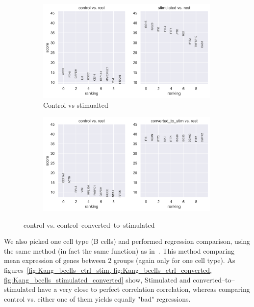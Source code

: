 \documentclass[11pt, a4paper]{report}
\theoremstyle{plain}
\theoremstyle{definition}
\theoremstyle{remark}
\begin{document}
\begin{figure}[h]
\centering
\begin{subfigure}[t]{0.99\textwidth}
\includegraphics[width=0.99\textwidth]{images/Kang_super_val_ctrl_vs_stimulated.png}
\caption{Control vs stimualted}
\end{subfigure}
\begin{subfigure}[t]{0.99\textwidth}
\includegraphics[width=0.99\textwidth]{images/Kang_super_val_ctrl_vs_converted.png}
\caption{}
\end{subfigure}
\caption{control vs. control--converted--to--stimulated}
\label{fig:Kang_super_gene_markers}
\end{figure}

We also picked one cell type (B cells) and performed regression comparison,
using the same method (in fact the same function) as
in~\cite{lotfollahi2019scgen}. This method comparing mean expression of genes
between 2 groups (again only for one cell type).
As figures~\ref{fig:Kang_bcells_ctrl_stim, fig:Kang_bcells_ctrl_converted,
fig:Kang_bcells_stimulated_converted} show,
Stimulated and converted--to--stimulated have a very close to perfect
correlation correlation, whereas comparing control vs. either one of them yields 
equally "bad" regressions.
\end{document}
